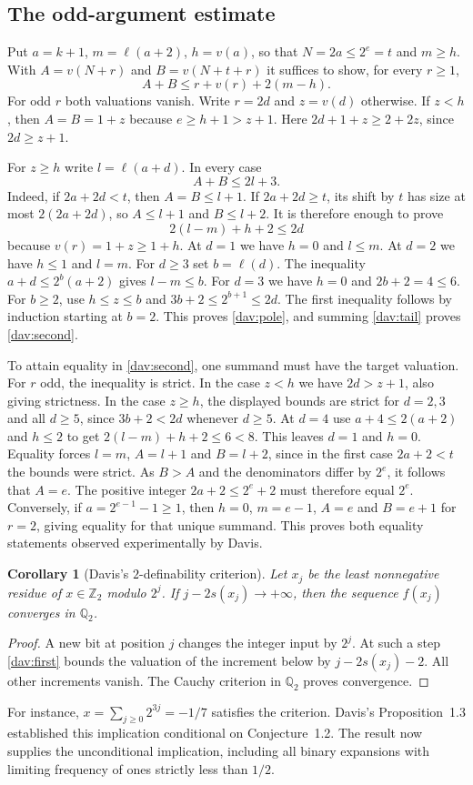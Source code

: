 \documentclass[11pt]{article}
\newtheorem{corollary}[theorem]{Corollary}
\begin{document}
\subsection{The odd-argument estimate}
Put $a=k+1$, $m=\ell(a+2)$, $h=v(a)$, so that
$N=2a\le 2^e=t$ and $m\ge h$. With $A=v(N+r)$ and
$B=v(N+t+r)$ it suffices to show, for every $r\ge1$,
\begin{equation}\label{dav:pole}
              A+B\le r+v(r)+2(m-h).
\end{equation}
For odd $r$ both valuations vanish. Write $r=2d$ and $z=v(d)$
otherwise. If $z<h$, then $A=B=1+z$ because $e\ge h+1>z+1$.
Here $2d+1+z\ge2+2z$, since $2d\ge z+1$.

For $z\ge h$ write $l=\ell(a+d)$. In every case
\[
 A+B\le 2l+3.
\]
Indeed, if $2a+2d<t$, then $A=B\le l+1$.
If $2a+2d\ge t$, its shift by $t$ has size at most $2(2a+2d)$,
so $A\le l+1$ and $B\le l+2$.
It is therefore enough to prove
\[
                       2(l-m)+h+2\le2d
\]
because $v(r)=1+z\ge1+h$. At $d=1$ we have $h=0$ and $l\le m$.
At $d=2$ we have $h\le1$ and $l=m$.
For $d\ge3$ set $b=\ell(d)$. The inequality
$a+d\le 2^b(a+2)$ gives $l-m\le b$.
For $d=3$ we have $h=0$ and $2b+2=4\le6$.
For $b\ge2$, use $h\le z\le b$ and
$3b+2\le2^{b+1}\le2d$. The first inequality follows by induction
starting at $b=2$. This proves \eqref{dav:pole}, and summing
\eqref{dav:tail} proves \eqref{dav:second}.

To attain equality in \eqref{dav:second}, one summand must have
the target valuation. For $r$ odd, the inequality is strict.
In the case $z<h$ we have $2d>z+1$, also giving strictness.
In the case $z\ge h$, the displayed bounds are strict for
$d=2,3$ and all $d\ge5$, since $3b+2<2d$ whenever
$d\ge5$. At $d=4$ use $a+4\le2(a+2)$ and $h\le2$ to
get $2(l-m)+h+2\le6<8$. This leaves $d=1$ and $h=0$.
Equality forces $l=m$, $A=l+1$ and $B=l+2$, since in the first
case $2a+2<t$ the bounds were strict. As $B>A$ and the
denominators differ by $2^e$, it follows that $A=e$.
The positive integer $2a+2\le2^e+2$ must therefore equal $2^e$.
Conversely, if $a=2^{e-1}-1\ge1$, then $h=0$, $m=e-1$,
$A=e$ and $B=e+1$ for $r=2$, giving equality for that unique
summand. This proves both equality statements observed experimentally
by Davis.

\begin{corollary}[Davis's $2$-definability criterion]\label{dav:cauchy}
Let $x_j$ be the least nonnegative residue of $x\in\mathbb Z_2$
modulo $2^j$. If $j-2s(x_j)\longrightarrow+\infty$, then the
sequence $f(x_j)$ converges in $\mathbb Q_2$.
\end{corollary}
\begin{proof}
A new bit at position $j$ changes the integer input by $2^j$.
At such a step \eqref{dav:first} bounds the valuation of the
increment below by $j-2s(x_j)-2$. All other increments vanish.
The Cauchy criterion in $\mathbb Q_2$ proves convergence.
\end{proof}
For instance, $x=\sum_{j\ge0}2^{3j}=-1/7$ satisfies the criterion.
Davis's Proposition~1.3 established this implication conditional on
Conjecture~1.2. The result now supplies the unconditional implication,
including all binary expansions with limiting frequency of ones
strictly less than $1/2$.
\end{document}
